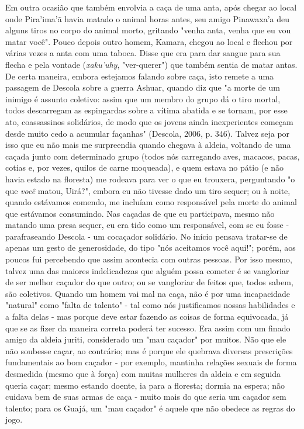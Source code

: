 Em outra ocasião que também envolvia a caça de uma anta, após chegar ao
local onde Pira'ima'ã havia matado o animal horas antes, seu amigo
Pinawaxa'a deu alguns tiros no corpo do animal morto, gritando "venha
anta, venha que eu vou matar você". Pouco depois outro homem, Kamara,
chegou ao local e flechou por várias vezes a anta com uma taboca. Disse
que era para dar sangue para sua flecha e pela vontade (\emph{xaku'uhy},
"ver-querer") que também sentia de matar antas. De certa maneira, embora
estejamos falando sobre caça, isto remete a uma passagem de Descola
sobre a guerra Ashuar, quando diz que "a morte de um inimigo é assunto
coletivo: assim que um membro do grupo dá o tiro mortal, todos
descarregam as espingardas sobre a vítima abatida e se tornam, por esse
ato, coassassinos solidários, de modo que os jovens ainda inexperientes
começam desde muito cedo a acumular façanhas" (Descola, 2006, p. 346).
Talvez seja por isso que eu não mais me surpreendia quando chegava à
aldeia, voltando de uma caçada junto com determinado grupo (todos nós
carregando aves, macacos, pacas, cotias e, por vezes, quilos de carne
moqueada), e quem estava no pátio (e não havia estado na floresta) me
rodeava para ver o que eu trouxera, perguntando "o que \emph{você}
matou, Uirá?", embora eu não tivesse dado um tiro sequer; ou à noite,
quando estávamos comendo, me incluíam como responsável pela morte do
animal que estávamos consumindo. Nas caçadas de que eu participava,
mesmo não matando uma presa sequer, eu era tido como um responsável, com
se eu fosse - parafraseando Descola - um cocaçador solidário. No início
pensava tratar-se de apenas um gesto de generosidade, do tipo "nós
aceitamos você aqui!"; porém, aos poucos fui percebendo que assim
acontecia com outras pessoas. Por isso mesmo, talvez uma das maiores
indelicadezas que alguém possa cometer é se vangloriar de ser melhor
caçador do que outro; ou se vangloriar de feitos que, todos sabem, são
coletivos. Quando um homem vai mal na caça, não é por uma incapacidade
"natural" como "falta de talento" - tal como nós justificamos nossas
habilidades e a falta delas - mas porque deve estar fazendo as coisas de
forma equivocada, já que se as fizer da maneira correta poderá ter
sucesso. Era assim com um finado amigo da aldeia juriti, considerado um
"mau caçador" por muitos. Não que ele não soubesse caçar, ao contrário;
mas é porque ele quebrava diversas prescrições fundamentais ao bom
caçador - por exemplo, mantinha relações sexuais de forma desmedida
(mesmo que à força) com muitas mulheres da aldeia e em seguida queria
caçar; mesmo estando doente, ia para a floresta; dormia na espera; não
cuidava bem de suas armas de caça - muito mais do que seria um caçador
sem talento; para os Guajá, um "mau caçador" é aquele que não obedece as
regras do jogo.

